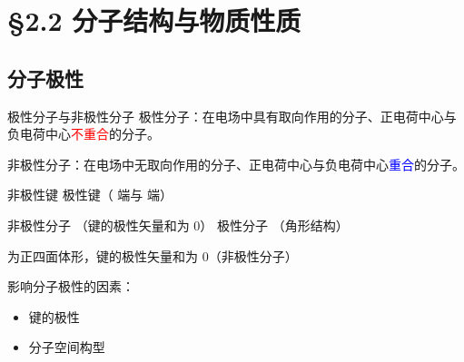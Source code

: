 \section{\S 2.2 分子结构与物质性质}\label{sect:分子结构与物质性质}

	\subsection{分子极性}\label{subsec:分子极性}

		\begin{dfn}{极性分子与非极性分子}
			极性分子：在电场中具有取向作用的分子、正电荷中心与负电荷中心\textcolor{red}{不重合}的分子。

			非极性分子：在电场中无取向作用的分子、正电荷中心与负电荷中心\textcolor{blue}{重合}的分子。
		\end{dfn}

		 非极性键   极性键（ 端与  端）

		非极性分子 （键的极性矢量和为 0） 极性分子 （角形结构）

		 为正四面体形，键的极性矢量和为 0（非极性分子）

		影响分子极性的因素：
		\begin{itemize}
			\item 键的极性
			\item 分子空间构型
		\end{itemize}

